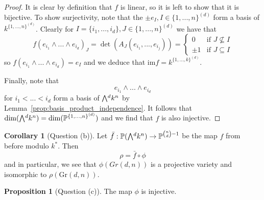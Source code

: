\documentclass{scrartcl}
\newcommand{\Proj}{\mathbb{P}}
\newcommand{\Gr}{\mathrm{Gr}}
\newcommand{\extpow}{\mathchoice{{\textstyle\bigwedge}}
    {{\bigwedge}}
    {{\textstyle\wedge}}
    {{\scriptstyle\wedge}}}
\theoremstyle{definition}
\newtheorem{proposition}[subsection]{Proposition}
\newtheorem{corollary}[subsection]{Corollary}
\begin{document}
\begin{proof}
    It is clear by definition that $f$ is linear, so it is left to show that it is bijective. 
    To show surjectivity, note that the $\pm e_I, I \in \{1, ..., n\}^{(d)}$ form a basis of $k^{\{1, ..., n\}^{(d)}}$.
    Clearly for $I = \{i_1, ..., i_d\}, J \in \{1, ..., n\}^{(d)}$ we have that
    \begin{equation*}
        f(e_{i_1} \wedge ... \wedge e_{i_d})_J = \det(A_J(e_{i_1}, ..., e_{i_j})) = \begin{cases}
            0 & \text{if $J \not\subseteq I$} \\
            \pm 1 & \text{if $J \subseteq I$}
        \end{cases}
    \end{equation*}
    so $f(e_{i_1} \wedge ... \wedge e_{i_d}) = e_I$ and we deduce that $\mathrm{im}f = k^{\{1, ..., k\}^{(d)}}$.

    Finally, note that
    \begin{equation*}
        e_{i_1} \wedge ... \wedge e_{i_d}
    \end{equation*}
    for $i_1 < ... < i_d$ form a basis of $\extpow^d k^n$ by Lemma~\ref{prop:basis_product_independence}.
    It follows that $\dim(\extpow^d k^n) = \dim(\Proj^{\{1, ..., n\}^{(d)}})$ and we find that $f$ is also injective.
\end{proof}
\begin{corollary}[Question (b)]
    \label{prop:image_phi}
    Let $\bar{f}: \Proj(\extpow^d k^n) \to \Proj^{{n \choose d} - 1}$ be the map $f$ from before modulo $k^*$.
    Then
    \begin{equation*}
        \rho = \bar{f} \circ \phi
    \end{equation*}
    and in particular, we see that $\phi(Gr(d, n))$ is a projective variety and isomorphic to $\rho(\Gr(d, n))$.
\end{corollary}
\begin{proposition}[Question (c)]
    The map $\phi$ is injective.
\end{proposition}
\end{document}
